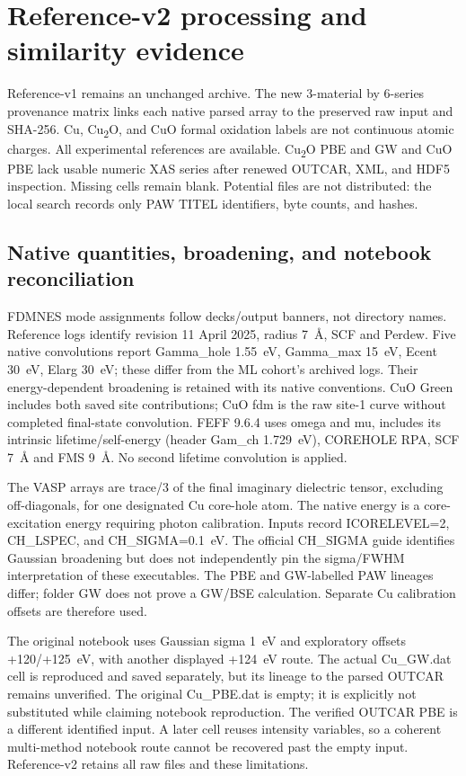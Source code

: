 \section{Reference-v2 processing and similarity evidence}
Reference-v1 remains an unchanged archive. The new 3-material by 6-series provenance matrix links each native parsed array to the preserved raw input and SHA-256. Cu, Cu\textsubscript{2}O, and CuO formal oxidation labels are not continuous atomic charges. All experimental references are available. Cu\textsubscript{2}O PBE and GW and CuO PBE lack usable numeric XAS series after renewed OUTCAR, XML, and HDF5 inspection. Missing cells remain blank. Potential files are not distributed: the local search records only PAW TITEL identifiers, byte counts, and hashes.

\subsection{Native quantities, broadening, and notebook reconciliation}
FDMNES mode assignments follow decks/output banners, not directory names. Reference logs identify revision 11 April 2025, radius 7~\AA, SCF and Perdew. Five native convolutions report Gamma\_hole 1.55~eV, Gamma\_max 15~eV, Ecent 30~eV, Elarg 30~eV; these differ from the ML cohort's archived logs. Their energy-dependent broadening is retained with its native conventions. CuO Green includes both saved site contributions; CuO fdm is the raw site-1 curve without completed final-state convolution. FEFF 9.6.4 uses omega and mu, includes its intrinsic lifetime/self-energy (header Gam\_ch 1.729~eV), COREHOLE RPA, SCF 7~\AA{} and FMS 9~\AA{}. No second lifetime convolution is applied.

The VASP arrays are trace/3 of the final imaginary dielectric tensor, excluding off-diagonals, for one designated Cu core-hole atom. The native energy is a core-excitation energy requiring photon calibration. Inputs record ICORELEVEL=2, CH\_LSPEC, and CH\_SIGMA=0.1~eV. The official CH\_SIGMA guide identifies Gaussian broadening but does not independently pin the sigma/FWHM interpretation of these executables. The PBE and GW-labelled PAW lineages differ; folder GW does not prove a GW/BSE calculation. Separate Cu calibration offsets are therefore used.

The original notebook uses Gaussian sigma 1~eV and exploratory offsets +120/+125~eV, with another displayed +124~eV route. The actual Cu\_GW.dat cell is reproduced and saved separately, but its lineage to the parsed OUTCAR remains unverified. The original Cu\_PBE.dat is empty; it is explicitly not substituted while claiming notebook reproduction. The verified OUTCAR PBE is a different identified input. A later cell reuses intensity variables, so a coherent multi-method notebook route cannot be recovered past the empty input. Reference-v2 retains all raw files and these limitations.

